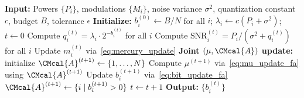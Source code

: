 \documentclass[10pt, twocolumn, comsoc]{IEEEtran}
\begin{document}

\begin{algorithm}[t]
\caption{RMWF for $N$-parallel channel}
\label{alg:rmwf_toy}
\begin{algorithmic}[1]
\STATE \textbf{Input:} Powers $\{P_i\}$, modulations 
$\{M_i\}$, noise variance $\sigma^2$, quantization 
constant $c$, budget $B$, tolerance $\epsilon$
\STATE \textbf{Initialize:} $b_i^{(0)} \leftarrow 
B/N$ for all $i$; $\lambda_i \leftarrow c(P_i + \sigma^2)$; 
$t \leftarrow 0$
\REPEAT
  \STATE Compute $q_i^{(t)} = \lambda_i 
         \cdot 2^{-b_i^{(t)}}$ for all $i$
  \STATE Compute $\mathrm{SNR}_i^{(t)} = P_i / 
         (\sigma^2 + q_i^{(t)})$ for all $i$
  \STATE Update $m_i^{(t)}$ 
         via~\eqref{eq:mercury_update}
  \STATE \textbf{Joint $(\mu, \CMcal{A})$ update:} initialize $\CMcal{A}^{(t+1)} \leftarrow \{1, \dots, N\}$
  \REPEAT
    \STATE Compute $\mu^{(t+1)}$ 
           via~\eqref{eq:mu_update_fa} using $\CMcal{A}^{(t+1)}$
    \STATE Update $b_i^{(t+1)}$ via~\eqref{eq:bit_update_fa}
    \STATE $\CMcal{A}^{(t+1)} \leftarrow \{i \mid b_i^{(t+1)} > 0\}$
  \STATE $t \leftarrow t + 1$
\STATE \textbf{Output:} $\{b_i^{(t)}\}$
\end{algorithmic}
\end{algorithm}
\end{document}
